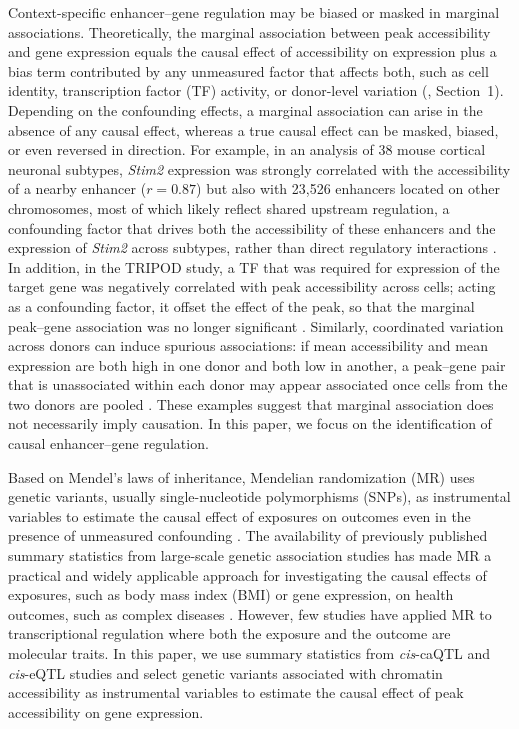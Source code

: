 \noindent Context-specific enhancer--gene regulation may be biased or masked in marginal associations. Theoretically, the marginal association between peak accessibility and gene expression equals the causal effect of accessibility on expression plus a bias term contributed by any unmeasured factor that affects both, such as cell identity, transcription factor (TF) activity, or donor-level variation (, Section~1). Depending on the confounding effects, a marginal association can arise in the absence of any causal effect, whereas a true causal effect can be masked, biased, or even reversed in direction. For example, in an analysis of 38 mouse cortical neuronal subtypes, \textit{Stim2} expression was strongly correlated with the accessibility of a nearby enhancer ($r = 0.87$) but also with 23,526 enhancers located on other chromosomes, most of which likely reflect shared upstream regulation, a confounding factor that drives both the accessibility of these enhancers and the expression of \textit{Stim2} across subtypes, rather than direct regulatory interactions \cite{xie2023robust}. In addition, in the TRIPOD study, a TF that was required for expression of the target gene was negatively correlated with peak accessibility across cells; acting as a confounding factor, it offset the effect of the peak, so that the marginal peak--gene association was no longer significant \cite{jiang2022tripod}. Similarly, coordinated variation across donors can induce spurious associations: if mean accessibility and mean expression are both high in one donor and both low in another, a peak--gene pair that is unassociated within each donor may appear associated once cells from the two donors are pooled \cite{su2025scmultimap}. These examples suggest that marginal association does not necessarily imply causation. In this paper, we focus on the identification of causal enhancer--gene regulation.

\noindent Based on Mendel's laws of inheritance, Mendelian randomization (MR) uses genetic variants, usually single-nucleotide polymorphisms (SNPs), as instrumental variables to estimate the causal effect of exposures on outcomes even in the presence of unmeasured confounding \cite{daveysmith2003mendelian,lawlor2008mendelian}. The availability of previously published summary statistics from large-scale genetic association studies has made MR a practical and widely applicable approach for investigating the causal effects of exposures, such as body mass index (BMI) or gene expression, on health outcomes, such as complex diseases \cite{burgess2013summarized,holmes2014bmi,zhu2016smr,richardson2020twmr}. However, few studies have applied MR to transcriptional regulation where both the exposure and the outcome are molecular traits. In this paper, we use summary statistics from \textit{cis}-caQTL and \textit{cis}-eQTL studies and select genetic variants associated with chromatin accessibility as instrumental variables to estimate the causal effect of peak accessibility on gene expression.

